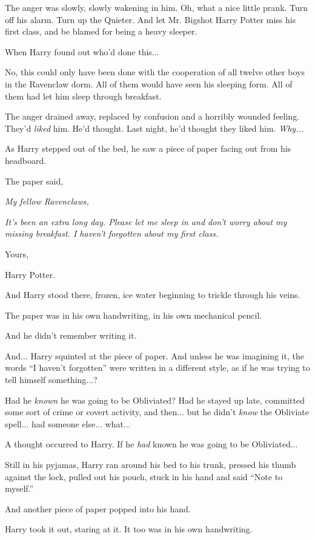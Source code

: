 The anger was slowly, slowly wakening in him. Oh, what a nice little
prank. Turn off his alarm. Turn up the Quieter. And let Mr. Bigshot
Harry Potter miss his first class, and be blamed for being a heavy
sleeper.

When Harry found out who'd done this...

No, this could only have been done with the cooperation of all twelve
other boys in the Ravenclaw dorm. All of them would have seen his
sleeping form. All of them had let him sleep through breakfast.

The anger drained away, replaced by confusion and a horribly wounded
feeling. They'd \emph{liked} him. He'd thought. Last night, he'd thought
they liked him. \emph{Why...}

As Harry stepped out of the bed, he saw a piece of paper facing out from
his headboard.

The paper said,

\emph{My fellow Ravenclaws,}

\emph{It's been an extra long day. Please let me sleep in and don't
worry about my missing breakfast. I haven't forgotten about my first
class.}

Yours,

Harry Potter.

And Harry stood there, frozen, ice water beginning to trickle through
his veins.

The paper was in his own handwriting, in his own mechanical pencil.

And he didn't remember writing it.

And... Harry squinted at the piece of paper. And unless he was
imagining it, the words ``I haven't forgotten'' were written in a
different style, as if he was trying to tell himself something...?

Had he \emph{known} he was going to be Obliviated? Had he stayed up
late, committed some sort of crime or covert activity, and then...
but he didn't \emph{know} the Obliviate spell... had someone
else... what...

A thought occurred to Harry. If he \emph{had} known he was going to be
Obliviated...

Still in his pyjamas, Harry ran around his bed to his trunk, pressed his
thumb against the lock, pulled out his pouch, stuck in his hand and said
``Note to myself.''

And another piece of paper popped into his hand.

Harry took it out, staring at it. It too was in his own handwriting.


